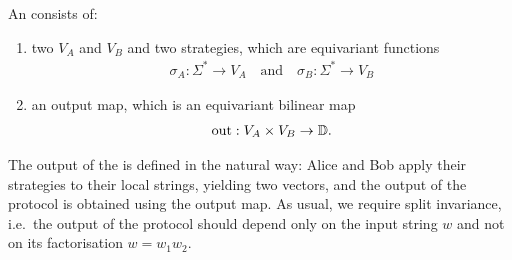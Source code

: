 
\begin{definition}
    \label{def:orbit-finite-scalar-product-protocol}
    \AP
    An  consists of:
    \begin{enumerate}
      \item two 
        $V_A$ and $V_B$ and two strategies, which are equivariant functions
        \begin{align*}
        \sigma_A : \Sigma^* \to V_A 
        \quad \text{and} \quad
        \sigma_B : \Sigma^* \to V_B
        \end{align*}
        \item an output map, which is an equivariant bilinear map 
        \begin{align*}
        \text{out} : V_A \times V_B \to \mathbb D.
        \end{align*}
    \end{enumerate}
\end{definition}
The output of the  is defined in the natural way: 
Alice and Bob apply their strategies to their local strings, yielding two vectors, 
and the output of the protocol is obtained using the output map. 
As usual, we require split invariance, i.e.~the output of the protocol should
depend only on the input string $w$ and not on its factorisation $w = w_1 w_2$.


